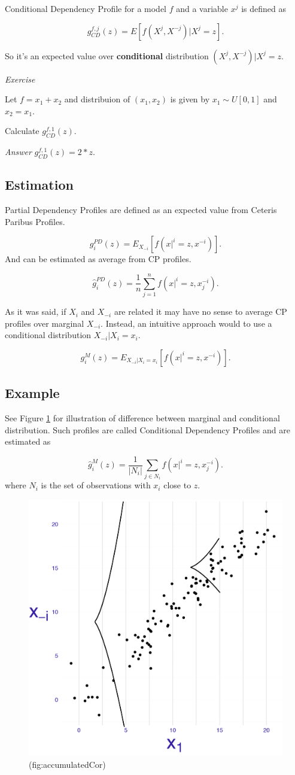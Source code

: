 \documentclass[12pt,]{krantz}
\begin{document}
Conditional Dependency Profile for a model \(f\) and a variable \(x^j\) is defined as

\[
g_{CD}^{f, j}(z) = E[f(X^j, X^{-j})|X^j = z].
\]

So it's an expected value over \textbf{conditional} distribution \((X^j,X^{-j})|X^j=z\).

\emph{Exercise}

Let \(f = x_1 + x_2\) and distribuion of \((x_1, x_2)\) is given by \(x_1 \sim U[0,1]\) and \(x_2=x_1\).

Calculate \(g_{CD}^{f, 1}(z)\).

\emph{Answer} \(g_{CD}^{f, 1}(z) = 2*z\).

\hypertarget{estimation-1}{%
\subsection{Estimation}\label{estimation-1}}

Partial Dependency Profiles are defined as an expected value from Ceteris Paribus Profiles.

\[
g^{PD}_i(z) = E_{X_{-i}}[ f(x|^i = z, x^{-i}) ].
\]
And can be estimated as average from CP profiles.

\[
\hat g^{PD}_i(z) = \frac{1}{n} \sum_{j=1}^{n} f(x|^i = z, x_j^{-i}).
\]

As it was said, if \(X_i\) and \(X_{-i}\) are related it may have no sense to average CP profiles over marginal \(X_{-i}\). Instead, an intuitive approach would to use a conditional distribution \(X_{-i}|X_i=x_i\).

\[
g^{M}_i(z) = E_{X_{-i}|X_i=x_i}[ f(x|^i = z, x^{-i}) ].
\]

\hypertarget{example-1}{%
\subsection{Example}\label{example-1}}

See Figure \ref{fig:accumulatedCor} for illustration of difference between marginal and conditional distribution. Such profiles are called Conditional Dependency Profiles and are estimated as

\[
\hat g^{M}_i(z) = \frac{1}{|N_i|} \sum_{j\in N_i} f(x|^i = z, x_j^{-i}). 
\]
where \(N_i\) is the set of observations with \(x_i\) close to \(z\).

\begin{figure}

{\centering \includegraphics[width=0.4\linewidth]{figure/CP_ALE_2} 

}

\caption{(fig:accumulatedCor) }\label{fig:accumulatedCor}
\end{figure}
\end{document}
